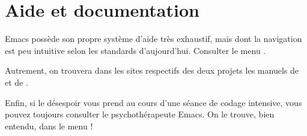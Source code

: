 \section{Aide et documentation}
\label{sec:emacs+ess:aide}

Emacs possède son propre système d'aide très exhaustif, mais dont la
navigation est peu intuitive selon les standards d'aujourd'hui.
Consulter le menu .

Autrement, on trouvera dans les sites respectifs des deux projets les
manuels de  et de
.

Enfin, si le désespoir vous prend au cours d'une séance de codage
intensive, vous pouvez toujours consulter le psychothérapeute Emacs.
On le trouve, bien entendu, dans le menu !


